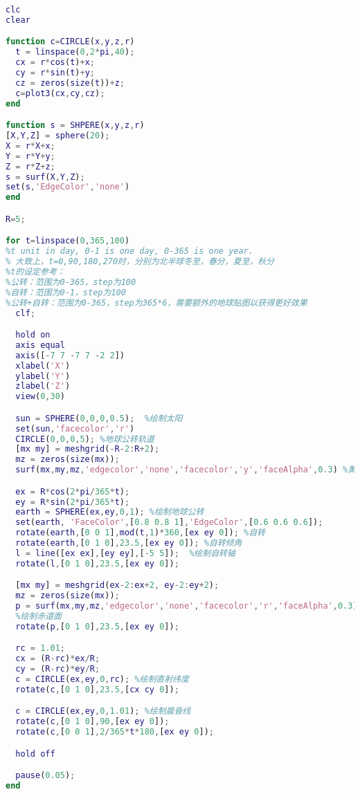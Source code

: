 \begin{lstlisting}[language=matlab]
clc
clear

function c=CIRCLE(x,y,z,r)
  t = linspace(0,2*pi,40);
  cx = r*cos(t)+x;
  cy = r*sin(t)+y;
  cz = zeros(size(t))+z;
  c=plot3(cx,cy,cz);
end

function s = SHPERE(x,y,z,r)
[X,Y,Z] = sphere(20);
X = r*X+x;
Y = r*Y+y;
Z = r*Z+z;
s = surf(X,Y,Z);
set(s,'EdgeColor','none')
end

R=5;

for t=linspace(0,365,100) 
%t unit in day, 0-1 is one day, 0-365 is one year.
% 大致上，t=0,90,180,270时，分别为北半球冬至，春分，夏至，秋分
%t的设定参考：
%公转：范围为0-365，step为100
%自转：范围为0-1，step为100
%公转+自转：范围为0-365，step为365*6，需要额外的地球贴图以获得更好效果
  clf;

  hold on
  axis equal
  axis([-7 7 -7 7 -2 2])
  xlabel('X')
  ylabel('Y')
  zlabel('Z')
  view(0,30)

  sun = SPHERE(0,0,0,0.5);  %绘制太阳
  set(sun,'facecolor','r')
  CIRCLE(0,0,0,5); %地球公转轨道
  [mx my] = meshgrid(-R-2:R+2);
  mz = zeros(size(mx));
  surf(mx,my,mz,'edgecolor','none','facecolor','y','faceAlpha',0.3) %黄道面

  ex = R*cos(2*pi/365*t);
  ey = R*sin(2*pi/365*t);
  earth = SPHERE(ex,ey,0,1); %绘制地球公转
  set(earth, 'FaceColor',[0.8 0.8 1],'EdgeColor',[0.6 0.6 0.6]);
  rotate(earth,[0 0 1],mod(t,1)*360,[ex ey 0]); %自转
  rotate(earth,[0 1 0],23.5,[ex ey 0]); %自转倾角
  l = line([ex ex],[ey ey],[-5 5]);  %绘制自转轴
  rotate(l,[0 1 0],23.5,[ex ey 0]);

  [mx my] = meshgrid(ex-2:ex+2, ey-2:ey+2);
  mz = zeros(size(mx));
  p = surf(mx,my,mz,'edgecolor','none','facecolor','r','faceAlpha',0.3);  
  %绘制赤道面
  rotate(p,[0 1 0],23.5,[ex ey 0]);

  rc = 1.01;
  cx = (R-rc)*ex/R;
  cy = (R-rc)*ey/R;
  c = CIRCLE(ex,ey,0,rc); %绘制直射纬度
  rotate(c,[0 1 0],23.5,[cx cy 0]);

  c = CIRCLE(ex,ey,0,1.01); %绘制晨昏线
  rotate(c,[0 1 0],90,[ex ey 0]);
  rotate(c,[0 0 1],2/365*t*180,[ex ey 0]);

  hold off

  pause(0.05);
end


\end{lstlisting}